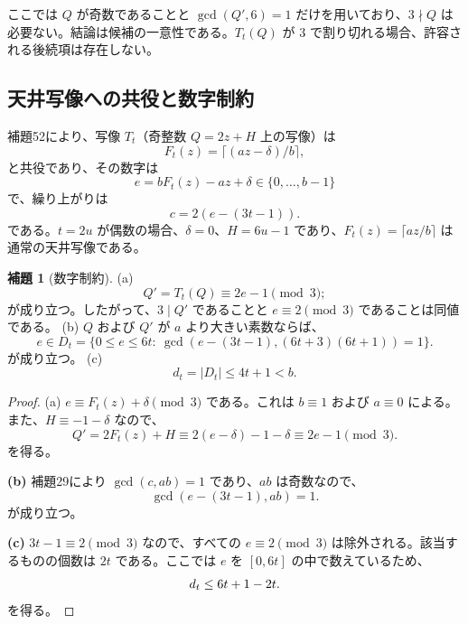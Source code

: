 \documentclass[11pt,reqno]{amsart}
\theoremstyle{definition}
\newtheorem{lemma}[theorem]{補題}
\theoremstyle{definition}
\theoremstyle{remark}
\begin{document}
ここでは \(Q\) が奇数であることと \(\gcd(Q',6)=1\) だけを用いており、\(3\nmid Q\) は必要ない。結論は候補の一意性である。\(T_t(Q)\) が \(3\) で割り切れる場合、許容される後続項は存在しない。

\subsection{天井写像への共役と数字制約}\label{sec:C.2}

補題52により、写像 \(T_t\)（奇整数 \(Q=2z+H\) 上の写像）は
\[
F_t(z)=\lceil(az-\delta)/b\rceil,
\]
と共役であり、その数字は
\[
e=bF_t(z)-az+\delta\in\{0,\ldots,b-1\}
\]
で、繰り上がりは
\[
c=2(e-(3t-1)).
\]
である。\(t=2u\) が偶数の場合、\(\delta=0\)、\(H=6u-1\) であり、\(F_t(z)=\lceil az/b\rceil\) は通常の天井写像である。

\begin{samepage}
\begin{lemma}[数字制約]\leavevmode\label{thm:56}
(a)
\[
Q'=T_t(Q)\equiv2e-1\pmod3;
\]
が成り立つ。したがって、\(3\mid Q'\) であることと \(e\equiv2\pmod3\) であることは同値である。
(b) \(Q\) および \(Q'\) が \(a\) より大きい素数ならば、
\[
e\in D_t=\{0\le e\le6t:\ \gcd(e-(3t-1),(6t+3)(6t+1))=1\}.
\]
が成り立つ。
(c)
\[
d_t=|D_t|\le4t+1<b.
\]
\label{thm-end:56}
\end{lemma}
\end{samepage}

\begin{proof}\leavevmode\label{proof:56}
(a) \(e\equiv F_t(z)+\delta\pmod3\) である。これは \(b\equiv1\) および \(a\equiv0\) による。また、\(H\equiv-1-\delta\) なので、
\[
Q'=2F_t(z)+H\equiv2(e-\delta)-1-\delta\equiv2e-1\pmod3.
\]
を得る。

\textbf{(b)} 補題29により \(\gcd(c,ab)=1\) であり、\(ab\) は奇数なので、
\[
\gcd(e-(3t-1),ab)=1.
\]
が成り立つ。

\textbf{(c)} \(3t-1\equiv2\pmod3\) なので、すべての \(e\equiv2\pmod3\) は除外される。該当するものの個数は \(2t\) である。ここでは \(e\) を \([0,6t]\) の中で数えているため、
\[
d_t\le6t+1-2t.\qedhere
\]
を得る。
\end{proof}

\end{document}
